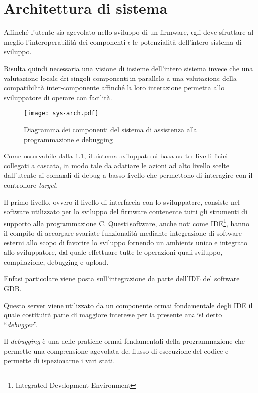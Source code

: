 \chapter{Architettura di sistema}

Affinché l'utente sia agevolato nello sviluppo di un firmware, egli deve sfruttare al meglio l'interoperabilità dei componenti e le potenzialità dell'intero sistema di sviluppo.

Risulta quindi necessaria una visione di insieme dell'intero sistema invece che una valutazione locale dei singoli componenti in parallelo a una valutazione della compatibilità inter-componente affinché la loro interazione permetta allo sviluppatore di operare con facilità.

\begin{figure}[t]
    \centering
    \texttt{[image: sys-arch.pdf]}
    \caption[]{Diagramma dei componenti del sistema di assistenza alla programmazione e debugging}\label{fig:sys-arch}
\end{figure}

Come osservabile dalla \cref{fig:sys-arch}, il sistema sviluppato si basa su tre livelli fisici collegati a cascata, in modo tale da adattare le azioni ad alto livello scelte dall'utente ai comandi di debug a basso livello che permettono di interagire con il controllore \textit{target}. 

Il primo livello, ovvero il livello di interfaccia con lo sviluppatore, consiste nel software utilizzato per lo sviluppo del firmware contenente tutti gli strumenti di supporto alla programmazione C. Questi software, anche noti come IDE\footnote{Integrated Development Environment}, hanno il compito di accorpare svariate funzionalità mediante integrazione di software esterni allo scopo di favorire lo sviluppo fornendo un ambiente unico e integrato allo sviluppatore, dal quale effettuare tutte le operazioni quali sviluppo, compilazione, debugging e upload.

Enfasi particolare viene posta sull'integrazione da parte dell'IDE del software GDB.\@

Questo server viene utilizzato da un componente ormai fondamentale degli IDE il quale costituirà parte di maggiore interesse per la presente analisi detto ``\textit{debugger}''.

Il \textit{debugging} è una delle pratiche ormai fondamentali della programmazione che permette una comprensione agevolata del flusso di esecuzione del codice e permette di ispezionarne i vari stati.

